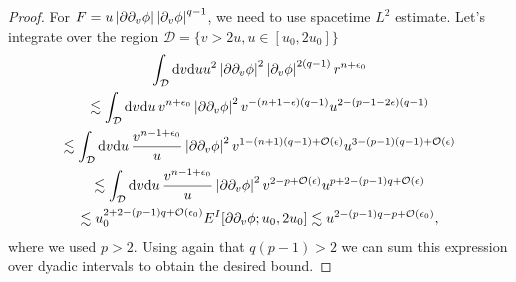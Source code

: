 \documentclass[11pt, oneside]{amsart}
\begin{document}
\begin{proof}
		
		For $F=u\left\lvert \partial\partial_v\phi\right\rvert\left\lvert \partial_v\phi\right\rvert^{q-1}$, we need to use spacetime $L^2$ estimate. Let's integrate over the region $\mathcal{D}=\{v>2u,u\in[u_0,2u_0]\}$
		\begin{equation*}
			\begin{gathered}
				\int_{\mathcal{D}}\mathrm{d} v \mathrm{d} u u^2\left\lvert \partial\partial_v\phi\right\rvert^2\left\lvert \partial_v\phi\right\rvert^{2(q-1)} r^{n+\epsilon_0}\\
				\lesssim\int_{\mathcal{D}}\mathrm{d} v \mathrm{d} u\,v^{n+\epsilon_0}\left\lvert \partial\partial_v\phi\right\rvert^2v^{-(n+1-\epsilon)(q-1)}u^{2-(p-1-2\epsilon)(q-1)}\\
				\lesssim\int_{\mathcal{D}}\mathrm{d} v \mathrm{d} u\,\frac{v^{n-1+\epsilon_0}}{u}\left\lvert \partial\partial_v\phi\right\rvert^2 v^{1-(n+1)(q-1)+\mathcal{O}(\epsilon)}u^{3-(p-1)(q-1)+\mathcal{O}(\epsilon)}\\
				\lesssim \int_{\mathcal{D}}\mathrm{d} v \mathrm{d} u\,\frac{v^{n-1+\epsilon_0}}{u}\left\lvert \partial\partial_v\phi\right\rvert^2 v^{2-p+\mathcal{O}(\epsilon)}u^{p+2-(p-1)q+\mathcal{O}(\epsilon)}\\
				\lesssim u_0^{2+2-(p-1)q+\mathcal{O}(\epsilon_0)} E^I[\partial\partial_v\phi;u_0,2u_0] \lesssim u^{2-(p-1)q-p+\mathcal{O}(\epsilon_0)},
			\end{gathered}
		\end{equation*}
		where we used $p>2$. Using again that $q(p-1)>2$ we can sum this expression over dyadic intervals to obtain the desired bound.
	
	\end{proof}
	

	
\end{document}

